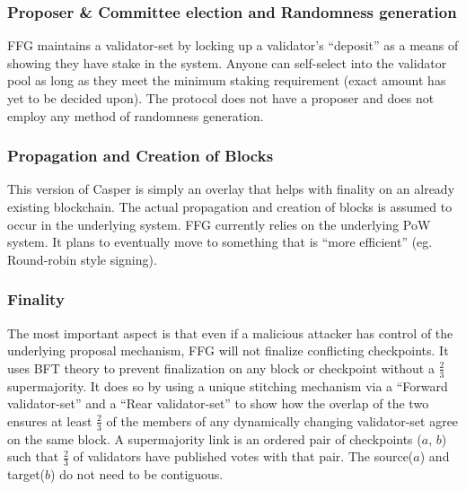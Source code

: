 \documentclass[10pt,journal,compsoc]{IEEEtran}
\begin{document}
\subsubsection{Proposer \& Committee election and Randomness generation}
FFG maintains a validator-set by locking up a validator’s “deposit” as a means of showing they have stake in the system. Anyone can self-select into the validator pool as long as they meet the minimum staking requirement (exact amount has yet to be decided upon). The protocol does not have a proposer and does not employ any method of randomness generation.

\subsubsection{Propagation and Creation of Blocks}
This version of Casper is simply an overlay that helps with finality on an already existing blockchain. The actual propagation and creation of blocks is assumed to occur in the underlying system. FFG currently relies on the underlying PoW system. It plans to eventually move to something that is “more efficient” (eg. Round-robin style signing).

\subsubsection{Finality}
The most important aspect is that even if a malicious attacker has control of the underlying proposal mechanism, FFG will not finalize conflicting checkpoints. It uses BFT theory to prevent finalization on any block or checkpoint without a \(\frac{2}{3}\) supermajority. It does so by using a unique stitching mechanism via a “Forward validator-set” and a “Rear validator-set” to show how the overlap of the two ensures at least \(\frac{2}{3}\) of the members of any dynamically changing validator-set agree on the same block. A supermajority link is an ordered pair of checkpoints ($a$, $b$) such that \(\frac{2}{3}\) of validators have published votes with that pair. The source($a$) and target($b$) do not need to be contiguous. 
\end{document}
